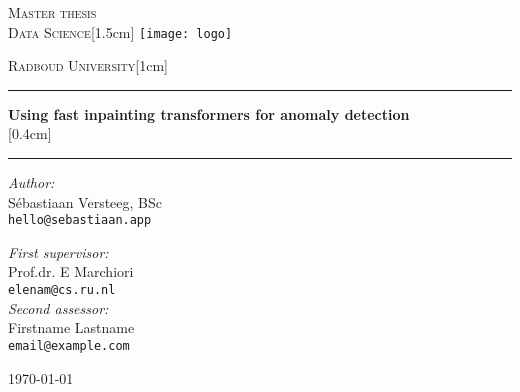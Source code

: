 \documentclass[11pt,a4paper]{report}
\begin{document}
\begin{titlepage}
\begin{center}
\textsc{\LARGE Master thesis\\Data Science}[1.5cm]
\texttt{[image: logo]}

\vspace{0.4cm}
\textsc{\Large Radboud University}[1cm]
\hrule
\vspace{0.4cm}
\textbf{\huge Using fast inpainting transformers for anomaly detection\\[0.3cm]
\LARGE  
}[0.4cm]
\hrule
\vspace{2cm}
\begin{minipage}[t]{0.45\textwidth}
\begin{flushleft} \large
\textit{Author:}\\
Sébastiaan Versteeg, BSc\\
\texttt{hello@sebastiaan.app}
\end{flushleft}
\end{minipage}
\begin{minipage}[t]{0.45\textwidth}
\begin{flushright} \large
\textit{First supervisor:}\\
Prof.dr. E Marchiori\\
\texttt{elenam@cs.ru.nl}\\[1.3cm]
\textit{Second assessor:}\\
Firstname Lastname\\
\texttt{email@example.com}
\end{flushright}
\end{minipage}
\vfill
{\large \today}
\end{center}
\end{titlepage}



\tableofcontents











\appendix


\newpage
\listoftodos[Notes]
\end{document}
